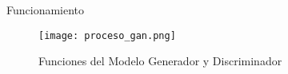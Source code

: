 \begin{frame}{Funcionamiento}
   \begin{figure}[H]
      \begin{center}
        \texttt{[image: proceso\_gan.png]}
        \caption{Funciones del Modelo Generador y Discriminador}
        \label{Alexis9}
      \end{center}
   \end{figure}
   
\end{frame}